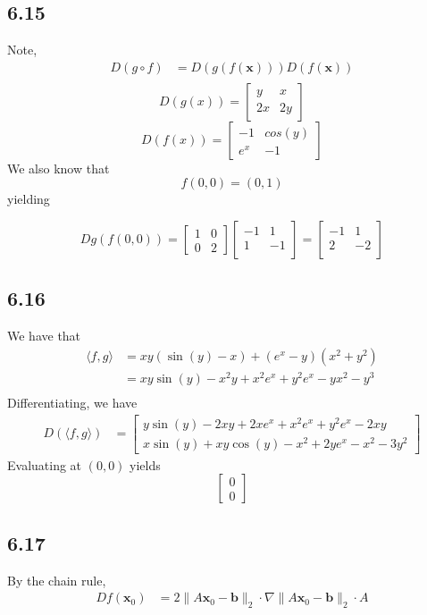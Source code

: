 \documentclass[letterpaper,12pt]{article}
\theoremstyle{definition}
\begin{document}
\subsection*{6.15}

Note,
\begin{align*}
D(g \circ f)&=D(g(f(\textbf{x})))D(f(\textbf{x}))\\
\end{align*}
\[D(g(x)) = \begin{bmatrix} y & x\\ 2x& 2y \end{bmatrix}\]
\[D(f(x)) = \begin{bmatrix} -1 & cos(y) \\ e^x& -1 \end{bmatrix}\]
    We also know that
\[f(0,0) = (0,1)\]
yielding

\[Dg(f(0,0)) = \begin{bmatrix} 1&0\\0&2\end{bmatrix} \begin{bmatrix}-1 & 1 \\
                1 & -1 \\
\end{bmatrix}
= \begin{bmatrix}-1 & 1 \\
                2 & -2 \\
\end{bmatrix}\]










\subsection*{6.16}
We have that
\begin{align*}
    \langle f, g\rangle &= xy(\sin(y) - x) + (e^x - y)(x^2 + y^2) \\
    &= xy\sin(y) - x^2y + x^2e^x+y^2e^x-yx^2 - y^3 \\
\end{align*}
Differentiating, we have
\begin{align*}
    D(\langle f, g\rangle) & = 
    \begin{bmatrix}
        y\sin(y) - 2xy + 2xe^x + x^2e^x+ y^2e^x - 2xy \\
        x\sin(y) + xy\cos(y) - x^2 +2ye^x - x^2 - 3y^2
    \end{bmatrix}
\end{align*}
Evaluating at $(0,0)$ yields
\[\begin{bmatrix}
0\\
0
\end{bmatrix}\]

\subsection*{6.17}
By the chain rule, 
\begin{align*}
    D f( \textbf{x}_0) &= 2 \|A \textbf{x}_0 - \textbf{b} \|_2 \cdot \nabla \| A \textbf{x}_0 - \textbf{b} \|_2 \cdot A
\end{align*}
\end{document}
